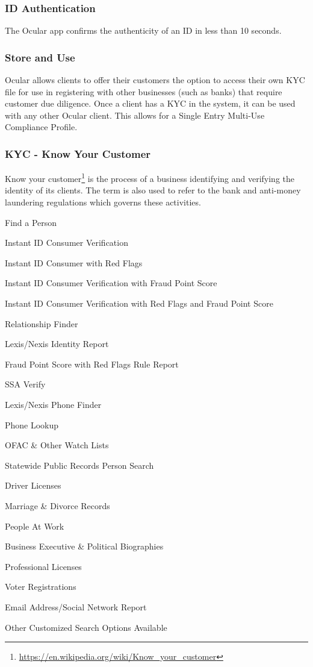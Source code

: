 \documentclass[12pt]{article}
\let\tempone\itemize
\let\temptwo\enditemize
\renewenvironment{itemize}{\tempone\addtolength{\itemsep}{-5pt}}{\temptwo}
\begin{document}
\subsubsection*{ID Authentication}
The Ocular app confirms the authenticity of an ID in less than 10 seconds.

\subsubsection*{Store and Use}
Ocular allows clients to offer their customers the option to access their own KYC file for use in registering with other businesses (such as banks) that require customer due diligence. Once a client has a KYC in the system, it can be used with any other Ocular client. This allows for a Single Entry Multi-Use Compliance Profile.

\subsubsection*{KYC - Know Your Customer}
Know your customer\footnote{\url{https://en.wikipedia.org/wiki/Know\_your\_customer}} is the process of a business identifying and verifying the identity of its clients. The term is also used to refer to the bank and anti-money laundering regulations which governs these activities.

\begin{itemize}
\item Find a Person
\item Instant ID Consumer Verification
\item Instant ID Consumer with Red Flags
\item Instant ID Consumer Verification with Fraud Point Score
\item Instant ID Consumer Verification with Red Flags and Fraud Point Score
\item Relationship Finder
\item Lexis/Nexis Identity Report
\item Fraud Point Score with Red Flags Rule Report
\item SSA Verify
\item Lexis/Nexis Phone Finder
\item Phone Lookup
\item OFAC \& Other Watch Lists
\item Statewide Public Records Person Search
\item Driver Licenses
\item Marriage \& Divorce Records
\item People At Work
\item Business Executive \& Political Biographies
\item Professional Licenses
\item Voter Registrations
\item Email Address/Social Network Report
\item Other Customized Search Options Available 
\end{itemize}
\end{document}
